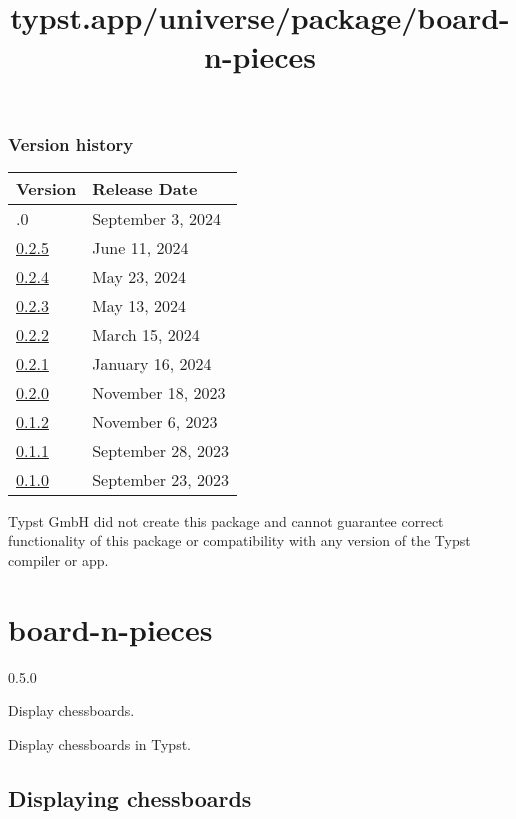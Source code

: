 \label{versions}
\subsubsection{Version history}\label{version-history}

\begin{longtable}[]{@{}ll@{}}
\toprule\noalign{}
Version & Release Date \\
\midrule\noalign{}
\endhead
\bottomrule\noalign{}
\endlastfoot
0.3.0 & September 3, 2024 \\
\href{https://typst.app/universe/package/diagraph/0.2.5/}{0.2.5} & June
11, 2024 \\
\href{https://typst.app/universe/package/diagraph/0.2.4/}{0.2.4} & May
23, 2024 \\
\href{https://typst.app/universe/package/diagraph/0.2.3/}{0.2.3} & May
13, 2024 \\
\href{https://typst.app/universe/package/diagraph/0.2.2/}{0.2.2} & March
15, 2024 \\
\href{https://typst.app/universe/package/diagraph/0.2.1/}{0.2.1} &
January 16, 2024 \\
\href{https://typst.app/universe/package/diagraph/0.2.0/}{0.2.0} &
November 18, 2023 \\
\href{https://typst.app/universe/package/diagraph/0.1.2/}{0.1.2} &
November 6, 2023 \\
\href{https://typst.app/universe/package/diagraph/0.1.1/}{0.1.1} &
September 28, 2023 \\
\href{https://typst.app/universe/package/diagraph/0.1.0/}{0.1.0} &
September 23, 2023 \\
\end{longtable}

Typst GmbH did not create this package and cannot guarantee correct
functionality of this package or compatibility with any version of the
Typst compiler or app.


\title{typst.app/universe/package/board-n-pieces}

\label{banner}
\section{board-n-pieces}\label{board-n-pieces}

{ 0.5.0 }

Display chessboards.

\label{readme}
Display chessboards in Typst.

\subsection{Displaying chessboards}\label{displaying-chessboards}

